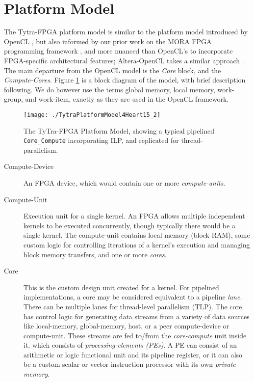 \documentclass[]{heart2015_WN4Pre}
\begin{document}
\section{Platform Model}
\label{sec:platform-model}

The Tytra-FPGA platform model is similar to the  platform model introduced by OpenCL \cite{112.155}, but also informed by  our prior work on the MORA FPGA  programming framework \cite{chalamalasetti2009mora}, and more nuanced than OpenCL's to incorporate FPGA-specific architectural features; Altera-OpenCL takes a similar approach \cite{112.151}. The main departure from the OpenCL model is the \textit{Core} block, and the \textit{Compute-Cores}. Figure \ref{fig:TytraPlatformModel4Heart15} is a block diagram of the model, with brief description following. We do however use the terms global memory, local memory, work-group, and work-item, exactly as they are used in the OpenCL framework.

\begin{figure}
\centering
\texttt{[image: ./TytraPlatformModel4Heart15\_2]}
\caption{The TyTra-FPGA Platform Model, showing a typical pipelined \texttt{Core\_Compute} incorporating ILP, and replicated for thread-parallelism.}
\label{fig:TytraPlatformModel4Heart15}
\end{figure}


\begin{description}
	\item [{Compute-Device}] An FPGA device, which would contain one or more \textit{compute-units}. 
	
	\item [{Compute-Unit}] Execution unit for  a single kernel. An FPGA allows multiple independent kernels to be executed concurrently, though typically there would be a single kernel. The compute-unit contains local memory (block RAM), some custom logic for controlling iterations of a kernel's execution and managing block memory transfers, and one or more \textit{cores}.
	
	\item [{Core}] This is the custom design unit created for a kernel. For pipelined implementations, a core may be considered equivalent to a pipeline \textit{lane}. There can be multiple lanes for thread-level parallelism (TLP). The core has control logic for generating data streams from a variety of data sources like local-memory, global-memory, host, or a peer compute-device or compute-unit. These streams are fed to/from the \textit{core-compute} unit inside it, which consists of \textit{processing-elements (PEs)}. A PE can consist of an arithmetic or logic functional unit and its pipeline register, or it can also be a custom scalar or vector instruction processor with its own \textit{private memory}.
\end{description}
\end{document}
